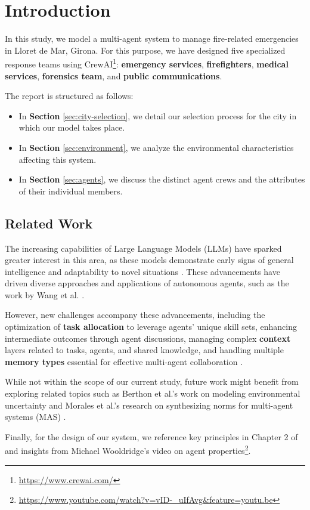 \section{Introduction}
\label{sec:introduction}

In this study, we model a multi-agent system to manage fire-related emergencies in Lloret de Mar, Girona. For this purpose, we have designed five specialized response teams using CrewAI\footnote{\url{https://www.crewai.com/}}: \textbf{emergency services}, \textbf{firefighters}, \textbf{medical services}, \textbf{forensics team}, and \textbf{public communications}.

The report is structured as follows:
\begin{itemize}
    \item In \textbf{Section} \ref{sec:city-selection}, we detail our selection process for the city in which our model takes place.
    \item In \textbf{Section} \ref{sec:environment}, we analyze the environmental characteristics affecting this system.
    \item In \textbf{Section} \ref{sec:agents}, we discuss the distinct agent crews and the attributes of their individual members.
\end{itemize}

\subsection{Related Work}

The increasing capabilities of Large Language Models (LLMs) have sparked greater interest in this area, as these models demonstrate early signs of general intelligence \cite{bubeck2023sparksartificialgeneralintelligence} and adaptability to novel situations \cite{HAUPTMAN2023107451}. These advancements have driven diverse approaches and applications of autonomous agents, such as the work by Wang et al. \cite{Wang_2024}.

However, new challenges accompany these advancements, including the optimization of \textbf{task allocation} to leverage agents' unique skill sets, enhancing intermediate outcomes through agent discussions, managing complex \textbf{context} layers related to tasks, agents, and shared knowledge, and handling multiple \textbf{memory types} essential for effective multi-agent collaboration \cite{han2024llmmultiagentsystemschallenges}.

While not within the scope of our current study, future work might benefit from exploring related topics such as Berthon et al.'s work on modeling environmental uncertainty \cite{berthon2024naturalstrategicabilitystochastic} and Morales et al.'s research on synthesizing norms for multi-agent systems (MAS) \cite{morales2017synthesisingevolutionarilystablenormative}.

Finally, for the design of our system, we reference key principles in Chapter 2 of \cite{wooldridge2009introduction} and insights from Michael Wooldridge's video on agent properties\footnote{\url{https://www.youtube.com/watch?v=vID-_uIfAvg&feature=youtu.be}}.

